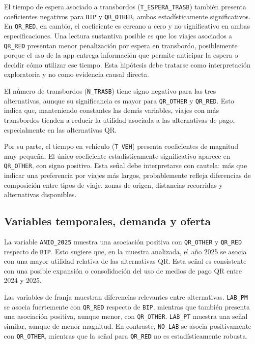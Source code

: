 El tiempo de espera asociado a transbordos (\texttt{T\_ESPERA\_TRASB}) también presenta coeficientes
negativos para \texttt{BIP} y \texttt{QR\_OTHER}, ambos estadísticamente significativos. En
\texttt{QR\_RED}, en cambio, el coeficiente es cercano a cero y no significativo en ambas
especificaciones. Una lectura sustantiva posible es que los viajes asociados a \texttt{QR\_RED}
presentan menor penalización por espera en transbordo, posiblemente porque el uso de la app entrega
información que permite anticipar la espera o decidir cómo utilizar ese tiempo. Esta hipótesis debe
tratarse como interpretación exploratoria y no como evidencia causal directa.

El número de transbordos (\texttt{N\_TRASB}) tiene signo negativo para las tres alternativas, aunque
su significancia es mayor para \texttt{QR\_OTHER} y \texttt{QR\_RED}. Esto indica que, manteniendo
constantes las demás variables, viajes con más transbordos tienden a reducir la utilidad asociada a
las alternativas de pago, especialmente en las alternativas QR.

Por su parte, el tiempo en vehículo (\texttt{T\_VEH}) presenta coeficientes de magnitud muy pequeña.
El único coeficiente estadísticamente significativo aparece en \texttt{QR\_OTHER}, con signo
positivo. Esta señal debe interpretarse con cautela: más que indicar una preferencia por viajes más
largos, probablemente refleja diferencias de composición entre tipos de viaje, zonas de origen,
distancias recorridas y alternativas disponibles.

\subsection{Variables temporales, demanda y oferta}

La variable \texttt{ANIO\_2025} muestra una asociación positiva con \texttt{QR\_OTHER} y
\texttt{QR\_RED} respecto de \texttt{BIP}. Esto sugiere que, en la muestra analizada, el año 2025 se
asocia con una mayor utilidad relativa de las alternativas QR. Esta señal es consistente con una
posible expansión o consolidación del uso de medios de pago QR entre 2024 y 2025.

Las variables de franja muestran diferencias relevantes entre alternativas. \texttt{LAB\_PM} se
asocia fuertemente con \texttt{QR\_RED} respecto de \texttt{BIP}, mientras que también presenta una
asociación positiva, aunque menor, con \texttt{QR\_OTHER}. \texttt{LAB\_PT} muestra una señal
similar, aunque de menor magnitud. En contraste, \texttt{NO\_LAB} se asocia positivamente con
\texttt{QR\_OTHER}, mientras que la señal para \texttt{QR\_RED} no es estadísticamente robusta.

